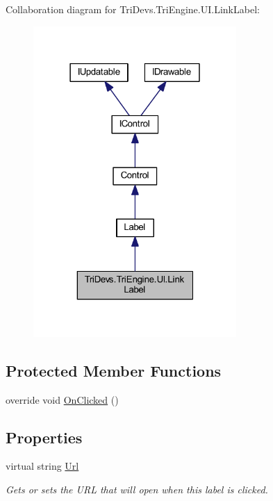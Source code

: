 Collaboration diagram for Tri\-Devs.\-Tri\-Engine.\-U\-I.\-Link\-Label\-:
\nopagebreak
\begin{figure}[H]
\begin{center}
\leavevmode
\includegraphics[width=219pt]{class_tri_devs_1_1_tri_engine_1_1_u_i_1_1_link_label__coll__graph}
\end{center}
\end{figure}
\subsection*{Protected Member Functions}
\begin{DoxyCompactItemize}
\item 
override void \hyperlink{class_tri_devs_1_1_tri_engine_1_1_u_i_1_1_link_label_a66262501ea5c2901ea8d487fe790ab7c}{On\-Clicked} ()
\end{DoxyCompactItemize}
\subsection*{Properties}
\begin{DoxyCompactItemize}
\item 
virtual string \hyperlink{class_tri_devs_1_1_tri_engine_1_1_u_i_1_1_link_label_a7e419f9c5c50fb8f76015813bcd6f689}{Url}
\begin{DoxyCompactList}\small\item\em Gets or sets the U\-R\-L that will open when this label is clicked. \end{DoxyCompactList}\end{DoxyCompactItemize}

